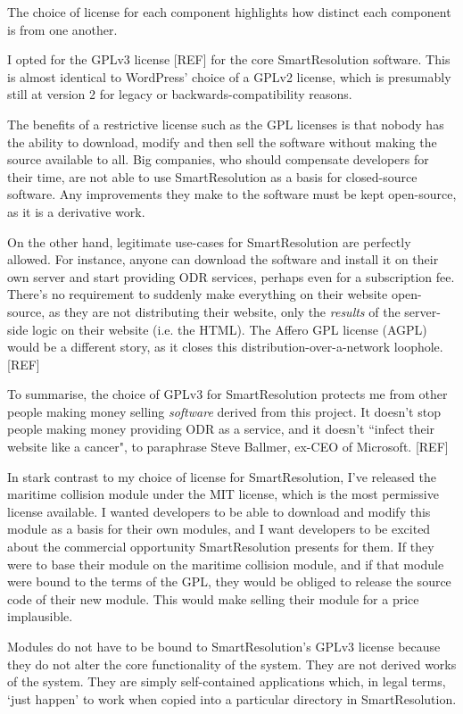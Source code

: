 The choice of license for each component highlights how distinct each component is from one another.

I opted for the GPLv3 license [REF] for the core SmartResolution software. This is almost identical to WordPress' choice of a GPLv2 license, which is presumably still at version 2 for legacy or backwards-compatibility reasons.

The benefits of a restrictive license such as the GPL licenses is that nobody has the ability to download, modify and then sell the software without making the source available to all. Big companies, who should compensate developers for their time, are not able to use SmartResolution as a basis for closed-source software. Any improvements they make to the software must be kept open-source, as it is a derivative work.

On the other hand, legitimate use-cases for SmartResolution are perfectly allowed. For instance, anyone can download the software and install it on their own server and start providing ODR services, perhaps even for a subscription fee. There's no requirement to suddenly make everything on their website open-source, as they are not distributing their website, only the \emph{results} of the server-side logic on their website (i.e. the HTML). The Affero GPL license (AGPL) would be a different story, as it closes this distribution-over-a-network loophole. [REF]

To summarise, the choice of GPLv3 for SmartResolution protects me from other people making money selling \emph{software} derived from this project. It doesn't stop people making money providing ODR as a service, and it doesn't ``infect their website like a cancer", to paraphrase Steve Ballmer, ex-CEO of Microsoft. [REF]

In stark contrast to my choice of license for SmartResolution, I've released the maritime collision module under the MIT license, which is the most permissive license available. I wanted developers to be able to download and modify this module as a basis for their own modules, and I want developers to be excited about the commercial opportunity SmartResolution presents for them. If they were to base their module on the maritime collision module, and if that module were bound to the terms of the GPL, they would be obliged to release the source code of their new module. This would make selling their module for a price implausible.

Modules do not have to be bound to SmartResolution's GPLv3 license because they do not alter the core functionality of the system. They are not derived works of the system. They are simply self-contained applications which, in legal terms, `just happen' to work when copied into a particular directory in SmartResolution.

